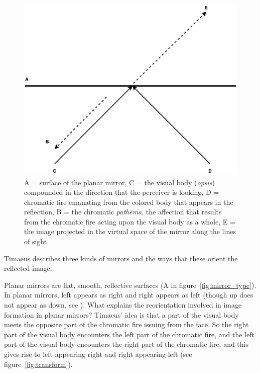 \begin{figure}[htbp]
	\centering
		\includegraphics[scale=0.4]{graphics/mirror_z.png}
	\caption{A = surface of the planar mirror, C = the visual body (\emph{opsis}) compounded in the direction that the perceiver is looking, D = chromatic fire emanating from the colored body that appears in the reflection, B = the chromatic \emph{pathēma}, the affection that results from the chromatic fire acting upon the visual body as a whole, E = the image projected in the virtual space of the mirror along the lines of sight}
	\label{fig:mirror_z}
\end{figure}

Timaeus describes three kinds of mirrors and the ways that these orient the reflected image.

Planar mirrors are flat, smooth, reflective surfaces (A in figure~\ref{fig:mirror_type}). In planar mirrors, left appears as right and right appears as left (though up does not appear as down, see \citealt{Block:1974tk}). What explains the reorientation involved in image formation in planar mirrors? Timae\-us' idea is that a part of the visual body meets the opposite part of the chromatic fire issuing from the face. So the right part of the visual body encounters the left part of the chromatic fire, and the left part of the visual body encounters the right part of the chromatic fire, and this gives rise to left appearing right and right appearing left (see figure~\ref{fig:transform}).

